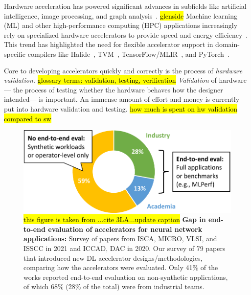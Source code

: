 
Hardware acceleration has powered significant advances
  in subfields like artificial intelligence, image processing, and graph analysis~\cite{han2016eie,chen2016eyeriss,reagen2016minerva,zhang2016cambricon,hameed2010understanding,ham2016graphicionado}.
\hl{glenside} Machine learning (ML) and other
  high-performance computing (HPC)
  applications increasingly rely on
  specialized hardware accelerators to
  provide speed and energy efficiency~\cite{jouppi2017tpu, krizhevsky2012conv, reuther2019survey}.
This trend has highlighted the need
  for flexible accelerator support
  in domain-specific compilers like
  Halide~\cite{halide},
  TVM~\cite{tvm},
  TensorFlow/MLIR~\cite{tensorflow, mlir}, and
  PyTorch~\cite{pytorch}.




Core to developing
  accelerators
  quickly and correctly
  is the process of \textit{hardware validation.}
\hl{glossary terms: validation, testing, verification}
\textit{Validation}
  of hardware---%
  the process of testing
  whether the hardware behaves
  how the designer intended---%
  is important.
An immense amount of effort
  and money
  is currently put
  into hardware validation and testing.
\hl{how much is spent on hw validation compared to sw}  

\begin{figure}[!ht]
  \begin{minipage}[h]{0.49\textwidth}
    \vspace{-5\fboxsep}
    \caption{
    \hl{this figure is taken from ...cite 3LA...update caption}
    \textbf{Gap in end-to-end evaluation of accelerators for neural network applications:} 
    Survey of papers from ISCA, MICRO, VLSI, and ISSCC in 2021 and ICCAD, DAC in 2020.
    Our survey of $79$ papers  that introduced new DL accelerator designs/methodologies, comparing how the accelerators were evaluated. Only 41\% of the works reported end-to-end evaluation on non-synthetic applications, of which 68\% (28\% of the total) were from industrial teams.
    }
    \label{fig:3la-pie}
  \end{minipage}\hfill
  \begin{minipage}[h]{0.49\textwidth}
    \includegraphics[width=\textwidth]{assets/3la-pie.pdf}
  \end{minipage}
\end{figure}


